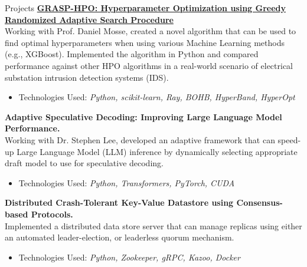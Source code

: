 \begin{rSection}{Projects}
    \href{https://github.com/shinwookim/GRASP-HPO/}{\textbf{GRASP-HPO: Hyperparameter Optimization using Greedy Randomized Adaptive Search Procedure}}
    \\
    Working with Prof. Daniel Mosse, created a novel algorithm that can be used to find optimal hyperparameters when using various Machine Learning methods (e.g., XGBoost). Implemented the algorithm in Python and compared performance against other HPO algorithms in a real-world scenario of electrical substation intrusion detection systems (IDS).
    \begin{itemize}\vspace{-0.25em}
        \item Technologies Used: \textit{Python, scikit-learn, Ray, BOHB, HyperBand, HyperOpt}
    \end{itemize}

    \textbf{Adaptive Speculative Decoding: Improving Large Language Model Performance.}
    \\
    Working with Dr. Stephen Lee, developed an adaptive framework that can speed-up Large Language Model (LLM) inference by dynamically selecting appropriate draft model to use for speculative decoding.
    \begin{itemize}\vspace{-0.25em}
        \item Technologies Used: \textit{Python, Transformers, PyTorch, CUDA}
    \end{itemize}

    \textbf{Distributed Crash-Tolerant Key-Value Datastore using Consensus-based Protocols.}\\
    {Implemented a distributed data store server that can manage replicas using either an automated leader-election, or leaderless quorum mechanism.}
    \begin{itemize}\vspace{-0.25em}
        \item Technologies Used: \textit{Python, Zookeeper, gRPC, Kazoo, Docker}
    \end{itemize}


\end{rSection}
